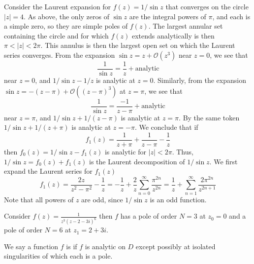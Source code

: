 \documentclass[12pt, a4paper, oneside, openright, titlepage]{book}
\begin{document}
\begin{eg}
    Consider the Laurent expansion for $f(z) = 1/\sin z$ that converges on the circle $|z| = 4$. As above, the only zeros of $\sin z$ are the integral powers of $\pi$, and each is a simple zero, so they are simple poles of $f(z)$. The largest annular set containing the circle and for which $f(z)$ extends analytically is then $\pi < |z| < 2\pi$. This annulus is then the largest open set on which the Laurent series converges. From the expansion $\sin z = z+\mathcal{O}(z^3)$ near $z = 0$, we see that \begin{equation*}
        \frac{1}{\sin z} = \frac{1}{z} + \text{analytic}
    \end{equation*}
    near $z = 0$, and $1/\sin z - 1/z$ is analytic at $z = 0$. Similarly, from the expansion $\sin z = -(z-\pi)+\mathcal{O}((z-\pi)^3)$ at $z = \pi$, we see that \begin{equation*}
        \frac{1}{\sin z} = \frac{-1}{z-\pi} + \text{analytic}
    \end{equation*}
    near $z = \pi$, and $1/\sin z + 1/(z-\pi)$ is analytic at $z = \pi$. By the same token $1/\sin z + 1/(z+\pi)$ is analytic at $z = -\pi$. We conclude that if \begin{equation*}
        f_1(z) = \frac{1}{z+\pi}+\frac{1}{z-\pi}-\frac{1}{z}
    \end{equation*}
    then $f_0(z) = 1/\sin z-f_1(z)$ is analytic for $|z| < 2\pi$. Thus, $1/\sin z = f_0(z) + f_1(z)$ is the Laurent decomposition of $1/\sin z$. We first expand the Laurent series for $f_1(z)$ \begin{equation*}
        f_1(z) = \frac{2z}{z^2-\pi^2}-\frac{1}{z} = -\frac{1}{z} + \frac{2}{z}\sum_{n=0}^{\infty}\frac{\pi^{2n}}{z^{2n}} = \frac{1}{z} + \sum_{n=1}^{\infty}\frac{2\pi^{2n}}{z^{2n+1}}
    \end{equation*}
    Note that all powers of $z$ are odd, since $1/\sin z$ is an odd function.
\end{eg}

\begin{eg}
    Consider $f(z) = \frac{1}{z^3(z-2-3i)^6}$ then $f$ has a pole of order $N = 3$ at $z_0 = 0$ and a pole of order $N = 6$ at $z_1 = 2 + 3i$.
\end{eg}

\begin{defn}
    We say a function $f$ is  if $f$ is analytic on $D$ except possibly at isolated singularities of which each is a pole.
\end{defn}
\end{document}
